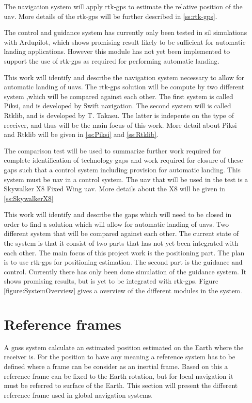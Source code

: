 The navigation system will apply \gls{rtk-gps} to estimate the relative position of the \gls{uav}. More details of the \gls{rtk-gps} will be further described in \ref{ss:rtk-gps}.

The control and guidance system has currently only been tested in \gls{sil} simulations with Ardupilot, which shows promising result likely to be sufficient for automatic landing applications. However this module has not yet been implemented to support the use of \gls{rtk-gps} as required for performing automatic landing.

This work will identify and describe the navigation system necessary to allow for automatic landing of \glspl{uav}. The \gls{rtk-gps} solution will be compute by two different system ,which will be compared against each other. The first system is called Piksi, and is developed by Swift navigation. The second system will is called Rtklib, and is developed by T. Takasu. The latter is indepente on the type of receiver, and thus will be the main focus of this work. More detail about Piksi and Rtklib will be given in \ref{ss:Piksi} and \ref{ss:Rtklib}.

The comparison test will be used to summarize further work required for complete identification of technology gaps and work required for closure of these gaps such that a control system including provision for automatic landing. This system must be \gls{uav} in a control system. The \gls{uav} that will be used in the test is a Skywalker X8 Fixed Wing \gls{uav}. More details about the X8 will be given in \ref{ss:SkywalkerX8}


This work will identify and describe the gaps which will need to be closed in order to find a solution which will allow for automatic landing of \glspl{uav}. Two different system that will be compared against each other. 
The current state of the system is that it consist of two parts that has not yet been integrated with each other. The main focus of this project work is the positioning part. The plan is to use \gls{rtk-gps} for positioning estimation. The second part is the guidance and control. Currently there has only been done simulation of the guidance system. It shows promising results, but is yet to be integrated with \gls{rtk-gps}. Figure \ref{figure:SystemOverview} gives a overview of the different modules in the system.
\section{Reference frames}
A \gls{gnss} system calculate an estimated position estimated on the Earth where the receiver is. For the position to have any meaning a reference system has to be defined where a frame can be consider as an inertial frame. Based on this a reference frame can be fixed to the Earth rotation, but for local navigation it must be referred to surface of the Earth. This section will present the different reference frame used in global navigation systems.
